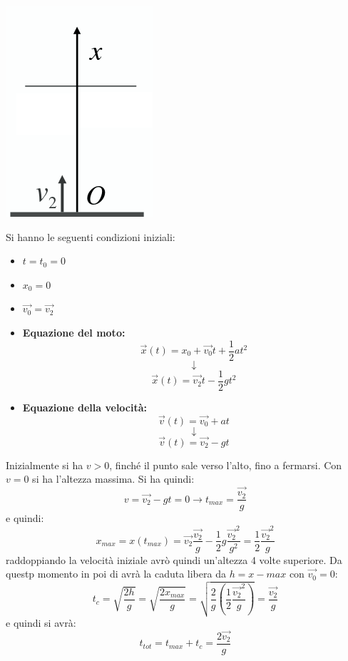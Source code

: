 \documentclass[a4paper,12pt, oneside]{book}
\begin{document}
\begin{center}
\includegraphics[scale=0.4]{img/vert3.png}
\end{center}
Si hanno le seguenti condizioni iniziali:
\begin{itemize}
\item $t=t_0=0$
\item $x_0=0$
\item $\vec{v_0}=\vec{v_2}$
\end{itemize}
\begin{itemize}
\item \textbf{Equazione del moto:}
$$\vec{x}(t)=x_0+\vec{v_0} t+\frac{1}{2} a  t^2$$
$$\downarrow$$
$$\vec{x}(t)=\vec{v_2}t-\frac{1}{2} g t^2$$
\item \textbf{Equazione della velocità:}
$$\vec{v}(t)=\vec{v_0}+a t$$
$$\downarrow$$
$$\vec{v}(t)=\vec{v_2}-gt$$
\end{itemize}
Inizialmente si ha $v>0$, finché il punto sale verso l'alto, fino a fermarsi. Con $v=0$ si ha l'altezza massima. Si ha quindi:
$$v=\vec{v_2}-gt=0\rightarrow t_{max}=\frac{\vec{v_2}}{g}$$
e quindi:
$$x_{max}=x(t_{max})=\vec{v_2}\frac{\vec{v_2}}{g}-\frac{1}{2}g\frac{\vec{v_2}^2}{g^2}=\frac{1}{2}\frac{\vec{v_2}^2}{g}$$
raddoppiando la velocità iniziale avrò quindi un'altezza 4 volte superiore. Da questp momento in poi di avrà la caduta libera da $h=x-max$ con $\vec{v_0}=0$:
$$t_c=\sqrt{\frac{2h}{g}}=\sqrt{\frac{2x_{max}}{g}}=\sqrt{\frac{2}{g}\left(\frac{1}{2}\frac{\vec{v_2}^2}{g}\right)}=\frac{\vec{v_2}}{g}$$
e quindi si avrà:
$$t_{tot}=t_{max}+t_c=\frac{2\vec{v_2}}{g}$$
\end{document}
